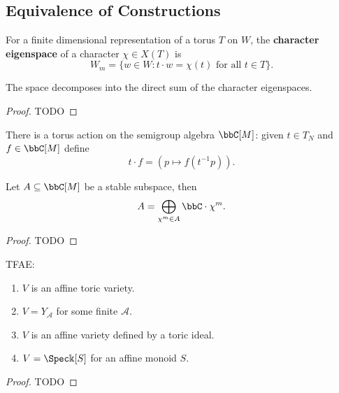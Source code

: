 \subsection{Equivalence of Constructions}


\begin{definition}
  \label{1-1-char-eigenspace}

  For a finite dimensional representation of a torus $T$ on $W$, the {\bf character eigenspace} of a character $\chi \in X(T)$ is
  \[
    W_m = \{w\in W : t\cdot w = \chi(t)\text{ for all } t\in T \}.
  \]
\end{definition}


\begin{proposition}
  \label{1-1-2-char-eigenspace-direct-sum}

  The space decomposes into the direct sum of the character eigenspaces.
\end{proposition}
\begin{proof}
  \uses{}

  TODO
\end{proof}

\begin{definition}
  \label{1-1-tor-act-alg}

  There is a torus action on the semigroup algebra $\bbC[M]$: given $t\in T_N$ and $f\in \bbC[M]$ define
  \[
    t \cdot f = (p \mapsto f(t^{-1}p)).
  \]
\end{definition}


\begin{lemma}
  \label{1-1-16-total-red}
    Let $A \subseteq \bbC[M]$ be a stable subspace, then
    \[
      A = \bigoplus_{\chi^m \in A} \bbC \cdot \chi^m.
    \]
\end{lemma}
\begin{proof}

  TODO
\end{proof}


\begin{theorem}
  \label{thm:1-1-17}
  TFAE:
  \begin{enumerate}
    \item $V$ is an affine toric variety.
    \item $V = Y_{\mathcal A}$ for some finite $\mathcal A$.
    \item $V$ is an affine variety defined by a toric ideal.
    \item $V = \Spec \Bbbk[S]$ for an affine monoid $S$.
  \end{enumerate}
\end{theorem}
\begin{proof}

  TODO
\end{proof}
